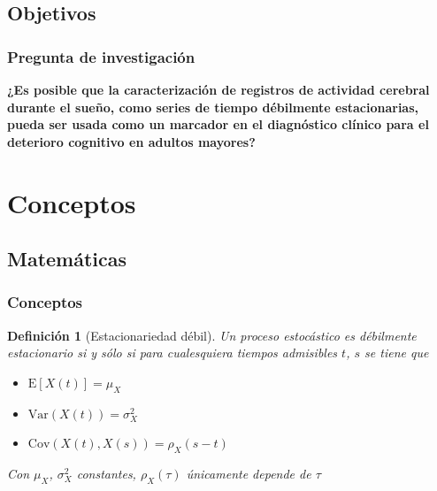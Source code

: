 \documentclass{beamer}
\newtheorem{defn}{Definici\'on}
\newcommand{\E}[1]{\mathrm{E}\left[ #1 \right]}
\newcommand{\Var}[1]{\mathrm{Var}\left( #1 \right)}
\newcommand{\Cov}[1]{\mathrm{Cov}\left( #1 \right)}
\begin{document}

\subsection{Objetivos}

\begin{frame}\frametitle{Pregunta de investigaci\'on}
\textbf{
¿Es posible que la caracterizaci\'on de registros de actividad cerebral durante el sue\~no, como 
series de tiempo d\'ebilmente estacionarias, pueda ser usada como un marcador en el diagn\'ostico 
cl\'inico para el deterioro cognitivo en adultos mayores?
}
\end{frame}


\section{Conceptos}


\subsection{Matem\'aticas}

\begin{frame}\frametitle{Conceptos}
\begin{defn}[Estacionariedad d\'ebil]
Un proceso estoc\'astico es d\'ebilmente estacionario si y s\'olo si para cualesquiera tiempos 
admisibles $t$, $s$ se tiene que
\begin{itemize}
\item $\E{X(t)} = \mu_X$
\item $\Var{X(t)} = \sigma^{2}_X$
\item $\Cov{X(t),X(s)} = \rho_X (s-t)$
\end{itemize}
Con $\mu_X$, $\sigma^{2}_X$ constantes, $\rho_X(\tau)$ \'unicamente depende de $\tau$
\end{defn}
\end{frame}
\end{document}
